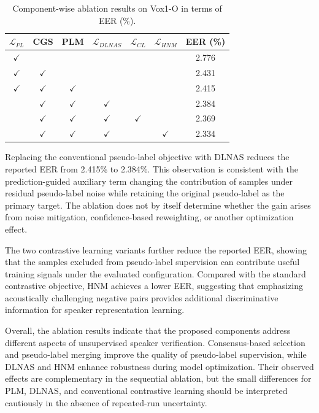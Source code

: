 \documentclass[journal]{IEEEtran}
\begin{document}
\begin{table}[!t] %
    \centering
    \caption{Component-wise ablation results on Vox1-O in terms of EER (\%).} %
    \setlength{\tabcolsep}{6.5pt} %
    \begin{tabular}{c c c c c c c} %
        \hline
        $\mathcal{L}_{PL}$ & CGS & PLM & $\mathcal{L}_{DLNAS}$  & $\mathcal{L}_{CL}$ & $\mathcal{L}_{HNM}$ & EER (\%)\\
        \hline
        $\checkmark$ & & & & & & 2.776  \\  
        $\checkmark$ & $\checkmark$ & & & & & 2.431\\
        $\checkmark$ & $\checkmark$  & $\checkmark$ & & & & 2.415\\
        &$\checkmark$ & $\checkmark$  & $\checkmark$ & & & 2.384\\
        &$\checkmark$ & $\checkmark$  & $\checkmark$ &$\checkmark$ & & 2.369\\
        &$\checkmark$ & $\checkmark$  & $\checkmark$ & &$\checkmark$ & 2.334\\
        \hline
    \end{tabular}
    \label{tab:ablation}
\end{table}
\FloatBarrier


Replacing the conventional pseudo-label objective with DLNAS reduces the
reported EER from 2.415\% to 2.384\%. This observation is consistent with
the prediction-guided auxiliary term changing the contribution of samples
under residual pseudo-label noise while retaining the original pseudo-label
as the primary target. The ablation does not by itself determine whether
the gain arises from noise mitigation, confidence-based reweighting, or
another optimization effect.

The two contrastive learning variants further reduce the reported EER,
showing that the samples excluded from pseudo-label supervision can
contribute useful training signals under the evaluated configuration.
Compared with the standard contrastive objective, HNM achieves a lower
EER, suggesting that emphasizing acoustically challenging negative
pairs provides additional discriminative information for speaker
representation learning.

Overall, the ablation results indicate that the proposed components
address different aspects of unsupervised speaker verification.
Consensus-based selection and pseudo-label merging improve the quality
of pseudo-label supervision, while DLNAS and HNM enhance robustness
during model optimization.
Their observed effects are complementary in the sequential ablation, but
the small differences for PLM, DLNAS, and conventional contrastive learning
should be interpreted cautiously in the absence of repeated-run
uncertainty.
\end{document}
